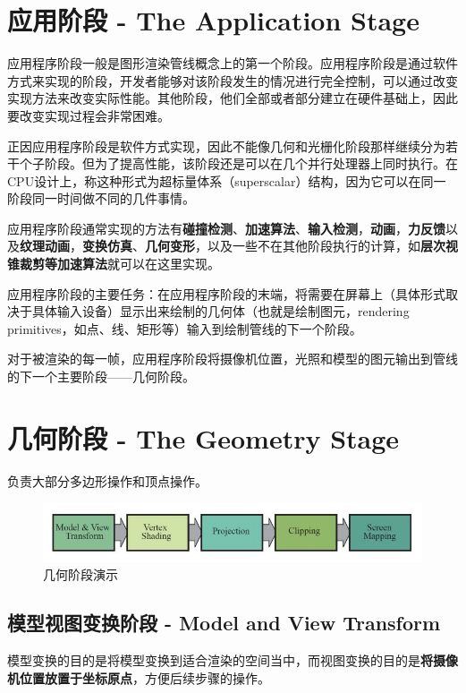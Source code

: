 \documentclass[UTF8,a4paper,12pt]{ctexbook}
\begin{document}
	\section{应用阶段 - The Application Stage}
		应用程序阶段一般是图形渲染管线概念上的第一个阶段。应用程序阶段是通过软件方式来实现的阶段，开发者能够对该阶段发生的情况进行完全控制，可以通过改变实现方法来改变实际性能。其他阶段，他们全部或者部分建立在硬件基础上，因此要改变实现过程会非常困难。
		
		正因应用程序阶段是软件方式实现，因此不能像几何和光栅化阶段那样继续分为若干个子阶段。但为了提高性能，该阶段还是可以在几个并行处理器上同时执行。在CPU设计上，称这种形式为超标量体系（superscalar）结构，因为它可以在同一阶段同一时间做不同的几件事情。
		
		应用程序阶段通常实现的方法有\textbf{碰撞检测}、\textbf{加速算法}、\textbf{输入检测}，\textbf{动画}，\textbf{力反馈}以及\textbf{纹理动画}，\textbf{变换仿真}、\textbf{几何变形}，以及一些不在其他阶段执行的计算，如\textbf{层次视锥裁剪等加速算法}就可以在这里实现。
		
		应用程序阶段的主要任务：在应用程序阶段的末端，将需要在屏幕上（具体形式取决于具体输入设备）显示出来绘制的几何体（也就是绘制图元，rendering primitives，如点、线、矩形等）输入到绘制管线的下一个阶段。
		
		对于被渲染的每一帧，应用程序阶段将摄像机位置，光照和模型的图元输出到管线的下一个主要阶段——几何阶段。
		
	
	\section{几何阶段 - The Geometry Stage}
		负责大部分多边形操作和顶点操作。
			\begin{figure}[H]
				\centering
				\includegraphics[scale=0.7]{Geometry}
				\caption{几何阶段演示}
			\end{figure}
		\subsection{模型视图变换阶段 - Model and View Transform} 
		
			模型变换的目的是将模型变换到适合渲染的空间当中，而视图变换的目的是\textbf{将摄像机位置放置于坐标原点}，方便后续步骤的操作。
			
\end{document}
